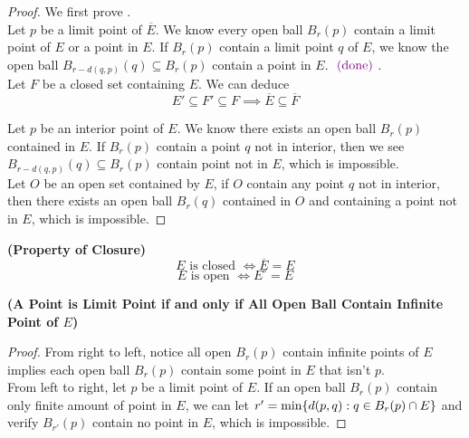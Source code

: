 \documentclass{report}
\begin{document}
\begin{proof}
  We first prove .\\

  Let $p$ be a limit point of  $\overline{E}$. We know every open ball $B_r(p)$ contain a limit point of $E$ or a point in $E$. If  $B_r(p)$ contain a limit point $q$ of $E$, we know the open ball $B_{r-d(q,p)}(q)\subseteq B_r(p)$ contain a point in $E$. $\textcolor{violet}{\text{ (done) }}$.\\

Let $F$ be a closed set containing  $E$. We can deduce 
 \begin{equation}
E'\subseteq F'\subseteq F\implies \overline{E}\subseteq \overline{F}
\end{equation}

Let $p$ be an interior point of $E$. We know there exists an open ball  $B_r(p)$ contained in $E$. If $B_r(p)$ contain a point $q$ not in interior, then we see $B_{r-d(q,p)}(q)\subseteq B_r(p)$ contain point not in $E$, which is impossible.\\

Let $O$ be an open set contained by $E$, if  $O$ contain any point $q$ not in interior, then there exists an open ball $B_r(q)$ contained in $O$ and containing a point not in $E$, which is impossible.  
\end{proof}
\begin{corollary}
\label{2.5.5}
\textbf{(Property of Closure)}
\begin{equation}
\text{ $E$ is closed $\iff \overline{E}=E$ }
\end{equation}
\begin{equation}
\text{ $E$ is open $\iff E^\circ =E$ }
\end{equation}
\end{corollary}
\begin{theorem}
\label{2.5.6}
\textbf{(A Point is Limit Point if and only if All Open Ball Contain Infinite Point of $E$)} 
\end{theorem}
\begin{proof}
  From right to left, notice all open $B_r(p)$ contain infinite points of $E$ implies each open ball $B_r(p)$ contain some point in $E$ that isn't  $p$.\\

  From left to right, let $p$ be a limit point of  $E$. If an open ball $B_r(p)$ contain only finite amount of point in $E$, we can let $r'=\min \{ d(p,q):q\in B_r(p)\cap E \}$ and verify  $B_{r'}(p)$ contain no point in $E$, which is impossible. 
\end{proof}
\end{document}
